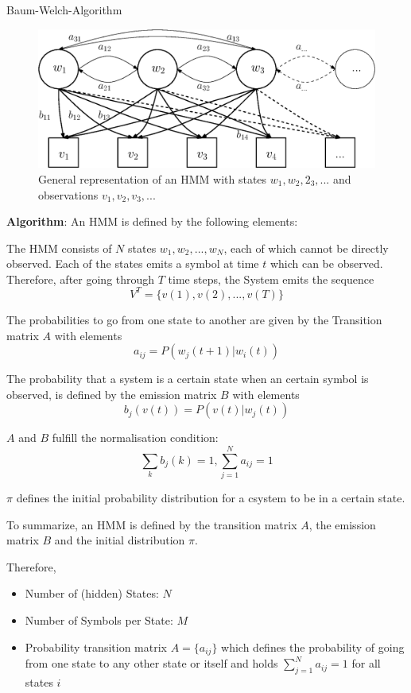 \documentclass[a4paper, oneside]{csthesis}
\begin{document}
Baum-Welch-Algorithm

\begin{figure}[tb]
    \begin{center}
        \includegraphics[width=\textwidth]{figures/hmm-general-model.eps}
    \end{center}
    \caption{General representation of an HMM with states $w_1, w_2, 2_3, ...$ and observations $v_1, v_2, v_3, ...$}
    \label{fig:hmm-general-model}
\end{figure}

\textbf{Algorithm}: An HMM is defined by the following elements:

The HMM consists of $N$ states $w_1, w_2, ..., w_N$, each of which cannot be directly observed. Each of the states emits a symbol at time $t$ which can be observed. Therefore, after going through $T$ time steps, the System emits the sequence $$V^T = \{ v(1), v(2), ..., v(T)\}$$

The probabilities to go from one state to another are given by the Transition matrix $A$ with elements $$a_{ij} = P(w_j(t+1)|w_i(t))$$

The probability that a system is a certain state when an certain symbol is observed, is defined by the emission matrix $B$ with elements
$$b_j(v(t)) = P(v(t)|w_j(t))$$

$A$ and $B$ fulfill the normalisation condition:
$$\sum_k b_j(k) = 1, \sum_{j=1}^{N} a_{ij} = 1$$


$\pi$ defines the initial probability distribution for a csystem to be in a certain state.

To summarize, an HMM is defined by the transition matrix $A$, the emission matrix $B$ and the initial distribution $\pi$.


Therefore,

\begin{itemize}
\item Number of (hidden) States: $N$
\item Number of Symbols per State: $M$
\item Probability transition matrix $A = \{a_{ij}\}$ which defines the probability of going from one state to any other state or itself and holds $\sum_{j=1}^{N} a_{ij} = 1$ for all states $i$
\end{itemize}
\end{document}
